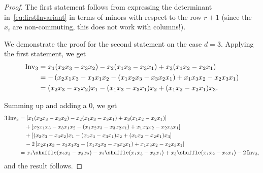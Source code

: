 \documentclass{scrartcl}
\theoremstyle{plain}
\theoremstyle{definition}
\newcommand{\1}[1]{1_{\{#1\}}}
\newcommand{\ds}{d} %
\begin{document}
\begin{proof}
  The first statement follows from expressing the determinant in~\ref{eq:firstInvariant}
  in terms of minors with respect to the row $r+1$
  (since the $x_i$ are non-commuting, this does not work with columns!).


  We demonstrate the proof for the second statement on the case $\ds=3$.
  Applying the first statement, we get
  \begin{align*}
    \operatorname{Inv}_{3}
    &=
    x_1 (x_2 x_3 - x_3 x_2) 
    -
    x_2 (x_1 x_3 - x_3 x_1) 
    +
    x_3 (x_1 x_2 - x_2 x_1) \\
    &=
    -
    \left(
    x_2 x_1 x_3 - x_3 x_1 x_2
    -
    (x_1 x_2 x_3 - x_3 x_2 x_1)
    +
    x_1 x_3 x_2 - x_2 x_3 x_1 \right) \\
    &=
    (x_2 x_3 - x_3 x_2) x_1
    -
    (x_1 x_3 - x_3 x_1) x_2 
    +
    (x_1 x_2 - x_2 x_1) x_3.
  \end{align*}

  Summing up and adding a $0$, we get
  \begin{align*}
    3 \firstInvariant{3}
    &=
    \left[
    x_1 (x_2 x_3 - x_3 x_2) 
    -
    x_2 (x_1 x_3 - x_3 x_1) 
    +
    x_3 (x_1 x_2 - x_2 x_1) \right] \\
    &\quad
    + 
    \left[
    x_2 x_1 x_3 - x_3 x_1 x_2
    -
    (x_1 x_2 x_3 - x_3 x_2 x_1)
    +
    x_1 x_3 x_2 - x_2 x_3 x_1 \right] \\
    &\quad
    +
    \left[
    (x_2 x_3 - x_3 x_2) x_1
    -
    (x_1 x_3 - x_3 x_1) x_2 
    +
    (x_1 x_2 - x_2 x_1) x_3 \right]\\
    &\quad-
    2 
    \left[
    x_2 x_1 x_3 - x_3 x_1 x_2
    -
    (x_1 x_2 x_3 - x_3 x_2 x_1)
    +
    x_1 x_3 x_2 - x_2 x_3 x_1 \right] \\
    &=
    x_1 \shuffle (x_2 x_3 - x_3 x_2)
    -
    x_2 \shuffle (x_1 x_3 - x_3 x_1)
    +
    x_3 \shuffle (x_1 x_2 - x_2 x_1)
    -
    2 \firstInvariant{3},
  \end{align*}
  and the result follows.
\end{proof}
\end{document}
